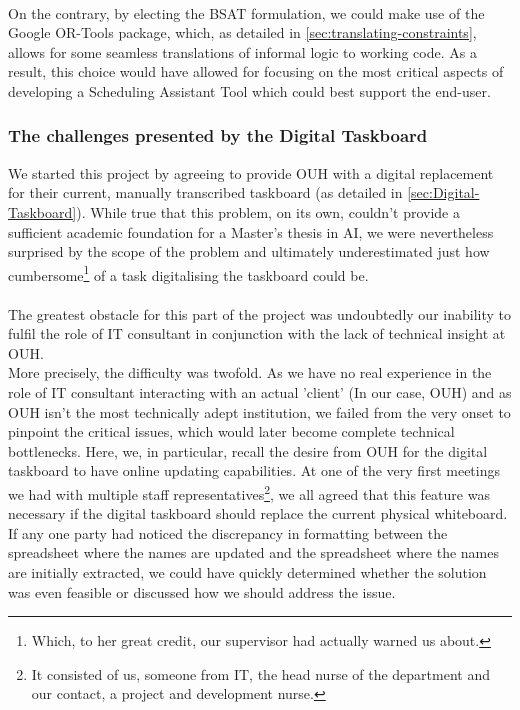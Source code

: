 \\
On the contrary, by electing the BSAT formulation, we could make use of the Google OR-Tools package, which, as detailed in \autoref{sec:translating-constraints}, allows for some seamless translations of informal logic to working code. As a result, this choice would have allowed for focusing on the most critical aspects of developing a Scheduling Assistant Tool which could best support the end-user.

\subsubsection*{The challenges presented by the Digital Taskboard}
We started this project by agreeing to provide OUH with a digital replacement for their current, manually transcribed taskboard (as detailed in \autoref{sec:Digital-Taskboard}). While true that this problem, on its own, couldn't provide a sufficient academic foundation for a Master's thesis in AI, we were nevertheless surprised by the scope of the problem and ultimately underestimated just how cumbersome\footnote{Which, to her great credit, our supervisor had actually warned us about.} of a task digitalising the taskboard could be.
\\
\\
The greatest obstacle for this part of the project was undoubtedly our inability to fulfil the role of IT consultant in conjunction with the lack of technical insight at OUH.
\\
More precisely, the difficulty was twofold. As we have no real experience in the role of IT consultant interacting with an actual 'client' (In our case, OUH) and as OUH isn't the most technically adept institution, we failed from the very onset to pinpoint the critical issues, which would later become complete technical bottlenecks. Here, we, in particular, recall the desire from OUH for the digital taskboard to have online updating capabilities. At one of the very first meetings we had with multiple staff representatives\footnote{It consisted of us, someone from IT, the head nurse of the department and our contact, a project and development nurse.}, we all agreed that this feature was necessary if the digital taskboard should replace the current physical whiteboard. If any one party had noticed the discrepancy in formatting between the spreadsheet where the names are updated and the spreadsheet where the names are initially extracted, we could have quickly determined whether the solution was even feasible or discussed how we should address the issue.
